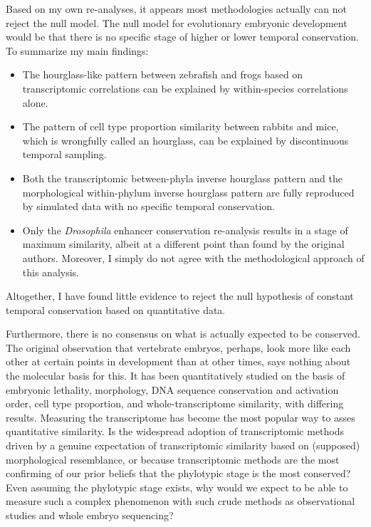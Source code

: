 Based on my own re-analyses, it appears most methodologies actually can not reject the null model. The null model for evolutionary embryonic development would be that there is no specific stage of higher or lower temporal conservation. To summarize my main findings:
\begin{itemize}
    \item The hourglass-like pattern between zebrafish and frogs based on transcriptomic correlations can be explained by within-species correlations alone.
    \item The pattern of cell type proportion similarity between rabbits and mice, which is wrongfully called an hourglass, can be explained by discontinuous temporal sampling.
    \item Both the transcriptomic between-phyla inverse hourglass pattern and the morphological within-phylum inverse hourglass pattern are fully reproduced by simulated data with no specific temporal conservation.
    \item Only the \textit{Drosophila} enhancer conservation re-analysis results in a stage of maximum similarity, albeit at a different point than found by the original authors. Moreover, I simply do not agree with the methodological approach of this analysis.
\end{itemize}
\noindent
Altogether, I have found little evidence to reject the null hypothesis of constant temporal conservation based on quantitative data.

Furthermore, there is no consensus on what is actually expected to be conserved. The original observation that vertebrate embryos, perhaps, look more like each other at certain points in development than at other times, says nothing about the molecular basis for this. It has been quantitatively studied on the basis of embryonic lethality\cite{Uchida2018}, morphology\cite{OlafRP2003,Cordero2020}, DNA sequence conservation\cite{Piasecka2013,Quint2012,Liu2021} and activation order\cite{Uesaka2019}, cell type proportion\cite{Mayshar2023}, and whole-transcriptome similarity\cite{Piasecka2013,Irie2011,marletaz2018,Liu2020,Leong2021,PerezPosada2022,Kalinka2010}, with differing results. Measuring the transcriptome has become the most popular way to asses quantitative similarity. Is the widespread adoption of transcriptomic methods driven by a genuine expectation of transcriptomic similarity based on (supposed) morphological resemblance, or because transcriptomic methods are the most confirming of our prior beliefs that the phylotypic stage is the most conserved? Even assuming the phylotypic stage exists, why would we expect to be able to measure such a complex phenomenon with such crude methods as observational studies and whole embryo sequencing?

